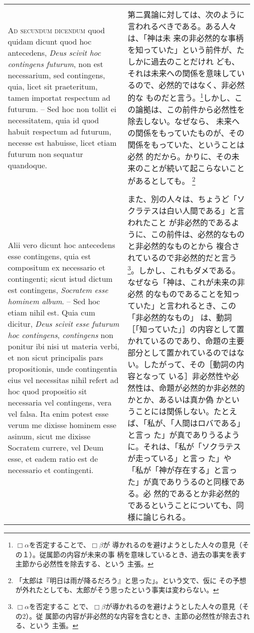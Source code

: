 \documentclass[10pt]{jsarticle} %
\begin{document}
\begin{longtable}{p{21em}p{21em}}
\\\\


{\scshape Ad secundum dicendum} quod quidam dicunt quod hoc
antecedens, {\itshape Deus scivit hoc contingens futurum}, non est
necessarium, sed contingens, quia, licet sit praeteritum, tamen
importat respectum ad futurum. -- Sed hoc non tollit ei necessitatem,
quia id quod habuit respectum ad futurum, necesse est habuisse, licet
etiam futurum non sequatur quandoque.

&

第二異論に対しては、次のように言われるべきである。ある人々は、「神は未
来の非必然的な事柄を知っていた」という前件が、たしかに過去のことだけれ
ども、それは未来への関係を意味しているので、必然的ではなく、非必然的な
ものだと言う。\footnote{$\Box \alpha$を否定することで、$\Box \beta$が
導かれるのを避けようとした人々の意見（その１）。従属節の内容が未来の事
柄を意味しているとき、過去の事実を表す主節から必然性を除去する、という
主張。}しかし、この論拠は、この前件から必然性を除去しない。なぜなら、
未来への関係をもっていたものが、その関係をもっていた、ということは必然
的だから。かりに、その未来のことが続いて起こらないことがあるとしても。
\footnote{「太郎は『明日は雨が降るだろう』と思った」。という文で、仮に
その予想が外れたとしても、太郎がそう思ったという事実は変わらない。}


\\\\


Alii vero dicunt hoc antecedens esse contingens, quia est compositum
ex necessario et contingenti; sicut istud dictum est contingens,
{\itshape Socratem esse hominem album}. -- Sed hoc etiam nihil
est. Quia cum dicitur, {\itshape Deus scivit esse futurum hoc
contingens}, {\itshape contingens} non ponitur ibi nisi ut materia
verbi, et non sicut principalis pars propositionis, unde contingentia
eius vel necessitas nihil refert ad hoc quod propositio sit necessaria
vel contingens, vera vel falsa. Ita enim potest esse verum me dixisse
hominem esse asinum, sicut me dixisse Socratem currere, vel Deum esse,
et eadem ratio est de necessario et contingenti.

&

また、別の人々は、ちょうど「ソクラテスは白い人間である」と言われたこと
が非必然的であるように、この前件は、必然的なものと非必然的なものとから
複合されているので非必然的だと言う\footnote{$\Box \alpha$を否定するこ
とで、$\Box \beta$が導かれるのを避けようとした人々の意見（その2）。従
属節の内容が非必然的な内容を含むとき、主節の必然性が除去される、という
主張。}。しかし、これもダメである。なぜなら「神は、これが未来の非必然
的なものであることを知っていた」と言われるとき、この「非必然的なもの」
は、動詞［「知っていた」］の内容として置かれているのであり、命題の主要
部分として置かれているのではない。したがって、その［動詞の内容となって
いる］非必然性や必然性は、命題が必然的か非必然的かとか、あるいは真か偽
かということには関係しない。たとえば、「私が、「人間はロバである」と言っ
た」が真でありうるように。それは、「私が「ソクラテスが走っている」と言っ
た」や「私が「神が存在する」と言った」が真でありうるのと同様である。必
然的であるとか非必然的であるということについても、同様に論じられる。


\end{longtable}
\end{document}
